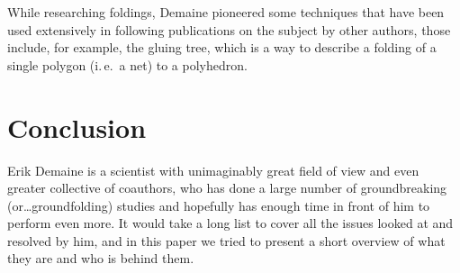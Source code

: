 \documentclass[a4paper,12pt]{article}
\begin{document}
While researching foldings, Demaine pioneered some techniques that have been used extensively in following publications on the subject by other authors, those include, for example, the gluing tree, which is a way to describe a folding of a single polygon (i.\,e.~a net) to a polyhedron.

\section{Conclusion}

Erik Demaine is a scientist with unimaginably great field of view and even greater collective of coauthors, who has done a large number of groundbreaking (or\ldots groundfolding) studies and hopefully has enough time in front of him to perform even more. It would take a long list to cover all the issues looked at and resolved by him, and in this paper we tried to present a short overview of what they are and who is behind them. \newpage

{}

\end{document}
